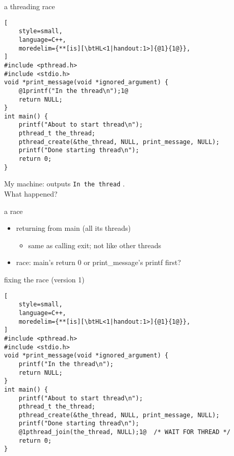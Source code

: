 
\begin{frame}[fragile,label=pthreadCreateBrokenP]{a threading race}
\begin{lstlisting}[
    style=small,
    language=C++,
    moredelim={**[is][\btHL<1|handout:1>]{@1}{1@}},
]
#include <pthread.h>
#include <stdio.h>
void *print_message(void *ignored_argument) {
    @1printf("In the thread\n");1@
    return NULL;
}
int main() {
    printf("About to start thread\n");
    pthread_t the_thread;
    pthread_create(&the_thread, NULL, print_message, NULL);
    printf("Done starting thread\n");
    return 0;
}
\end{lstlisting}
My machine: outputs \texttt{In the thread} . \\
What happened?
\end{frame}

\begin{frame}[fragile,label=pthreadCreateRace]{a race}
\begin{itemize}
\item returning from main  (all its threads)
    \begin{itemize}
    \item same as calling exit; not like other threads
    \end{itemize}
\item race: main's return 0 or print\_message's printf first?
\end{itemize}
\end{frame}

\begin{frame}[fragile,label=fixRace1]{fixing the race (version 1)}
\begin{lstlisting}[
    style=small,
    language=C++,
    moredelim={**[is][\btHL<1|handout:1>]{@1}{1@}},
]
#include <pthread.h>
#include <stdio.h>
void *print_message(void *ignored_argument) {
    printf("In the thread\n");
    return NULL;
}
int main() {
    printf("About to start thread\n");
    pthread_t the_thread;
    pthread_create(&the_thread, NULL, print_message, NULL);
    printf("Done starting thread\n");
    @1pthread_join(the_thread, NULL);1@  /* WAIT FOR THREAD */
    return 0;
}
\end{lstlisting}
\end{frame}

